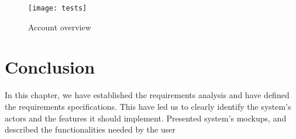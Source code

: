 \begin{figure}[ht]
\texttt{[image: tests]}
\caption{Account overview}
\label{fig:benchmarks_dashboard_tests}
\end{figure}

\section*{Conclusion}
In this chapter, we have established the requirements analysis and have defined
the requirements specifications. This have led us to clearly identify the
system's actors and the features it should implement. Presented  system's
mockups, and described the functionalities needed by the user
